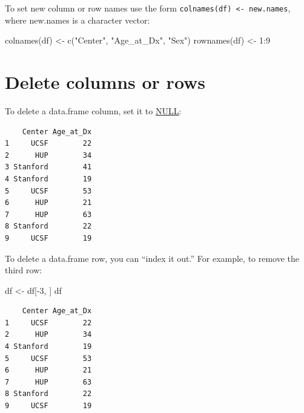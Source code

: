 \documentclass[
]{book}
\newenvironment{Shaded}{\begin{snugshade}}{\end{snugshade}}
\newcommand{\ConstantTok}[1]{\textcolor[rgb]{0.00,0.00,0.00}{#1}}
\newcommand{\DecValTok}[1]{\textcolor[rgb]{0.00,0.00,0.81}{#1}}
\newcommand{\FunctionTok}[1]{\textcolor[rgb]{0.00,0.00,0.00}{#1}}
\newcommand{\NormalTok}[1]{#1}
\newcommand{\OtherTok}[1]{\textcolor[rgb]{0.56,0.35,0.01}{#1}}
\newcommand{\SpecialCharTok}[1]{\textcolor[rgb]{0.00,0.00,0.00}{#1}}
\newcommand{\StringTok}[1]{\textcolor[rgb]{0.31,0.60,0.02}{#1}}
\begin{document}
To set new column or row names use the form \texttt{colnames(df)\ \textless{}-\ new.names}, where new.names is a character vector:

\begin{Shaded}
\begin{Highlighting}[]
\FunctionTok{colnames}\NormalTok{(df) }\OtherTok{\textless{}{-}} \FunctionTok{c}\NormalTok{(}\StringTok{"Center"}\NormalTok{, }\StringTok{"Age\_at\_Dx"}\NormalTok{, }\StringTok{"Sex"}\NormalTok{)}
\FunctionTok{rownames}\NormalTok{(df) }\OtherTok{\textless{}{-}} \DecValTok{1}\SpecialCharTok{:}\DecValTok{9}
\end{Highlighting}
\end{Shaded}

\hypertarget{delete-columns-or-rows}{%
\section{Delete columns or rows}\label{delete-columns-or-rows}}

To delete a data.frame column, set it to \protect\hyperlink{replacing-with-null}{NULL}:

\begin{Shaded}
\end{Shaded}

\begin{verbatim}
    Center Age_at_Dx
1     UCSF        22
2      HUP        34
3 Stanford        41
4 Stanford        19
5     UCSF        53
6      HUP        21
7      HUP        63
8 Stanford        22
9     UCSF        19
\end{verbatim}

To delete a data.frame row, you can ``index it out.'' For example, to remove the third row:

\begin{Shaded}
\begin{Highlighting}[]
\NormalTok{df }\OtherTok{\textless{}{-}}\NormalTok{ df[}\SpecialCharTok{{-}}\DecValTok{3}\NormalTok{, ]}
\NormalTok{df}
\end{Highlighting}
\end{Shaded}

\begin{verbatim}
    Center Age_at_Dx
1     UCSF        22
2      HUP        34
4 Stanford        19
5     UCSF        53
6      HUP        21
7      HUP        63
8 Stanford        22
9     UCSF        19
\end{verbatim}
\end{document}
